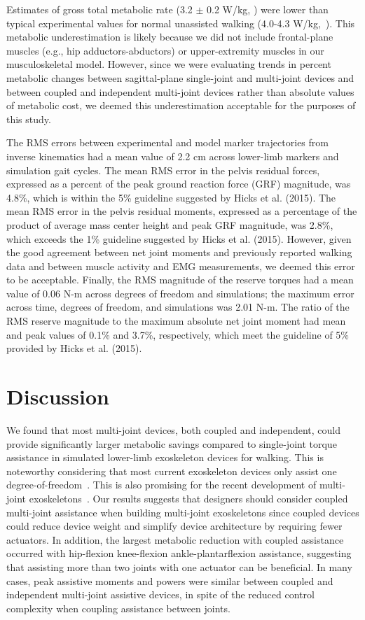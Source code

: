 \documentclass[10pt,letterpaper]{article}
\begin{document}
Estimates of gross total metabolic rate (3.2 $\pm$ 0.2 W/kg, ) were lower than typical experimental values for normal unassisted walking (4.0-4.3 W/kg,~\cite{Waters:1999}). This metabolic underestimation is likely because we did not include frontal-plane muscles (e.g., hip adductors-abductors) or upper-extremity muscles in our musculoskeletal model. However, since we were evaluating trends in percent metabolic changes between sagittal-plane single-joint and multi-joint devices and between coupled and independent multi-joint devices rather than absolute values of metabolic cost, we deemed this underestimation acceptable for the purposes of this study.

The RMS errors between experimental and model marker trajectories from inverse kinematics had a mean value of 2.2 cm across lower-limb markers and simulation gait cycles. The mean RMS error in the pelvis residual forces, expressed as a percent of the peak ground reaction force (GRF) magnitude, was 4.8\%, which is within the 5\% guideline suggested by Hicks et al. (2015). The mean RMS error in the pelvis residual moments, expressed as a percentage of the product of average mass center height and peak GRF magnitude, was 2.8\%, which exceeds the 1\% guideline suggested by Hicks et al. (2015). However, given the good agreement between net joint moments and previously reported walking data and between muscle activity and EMG measurements, we deemed this error to be acceptable. Finally, the RMS magnitude of the reserve torques had a mean value of 0.06 N-m across degrees of freedom and simulations; the maximum error across time, degrees of freedom, and simulations was 2.01 N-m. The ratio of the RMS reserve magnitude to the maximum absolute net joint moment had mean and peak values of 0.1\% and 3.7\%, respectively, which meet the guideline of 5\% provided by Hicks et al. (2015).

\section*{Discussion}
We found that most multi-joint devices, both coupled and independent, could provide significantly larger metabolic savings compared to single-joint torque assistance in simulated lower-limb exoskeleton devices for walking. This is noteworthy considering that most current exoskeleton devices only assist one degree-of-freedom~\cite{Gordon:2007, Mooney:2014, Collins:2015, Zhang:2017, Galle:2017, Kim:2019, Lim:2019}. This is also promising for the recent development of multi-joint exoskeletons~\cite{Quinlivan:2017, Malcolm:2018, Bryan:2020}. Our results suggests that designers should consider coupled multi-joint assistance when building multi-joint exoskeletons since coupled devices could reduce device weight and simplify device architecture by requiring fewer actuators. In addition, the largest metabolic reduction with coupled assistance occurred with hip-flexion knee-flexion ankle-plantarflexion assistance, suggesting that assisting more than two joints with one actuator can be beneficial. In many cases, peak assistive moments and powers were similar between coupled and independent multi-joint assistive devices, in spite of the reduced control complexity when coupling assistance between joints.
\end{document}
